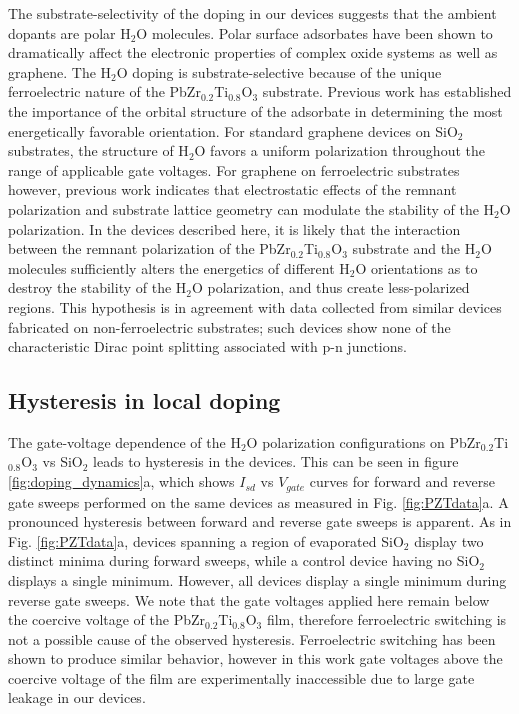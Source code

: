 \documentclass[edeposit,fullpage,draftthesis]{uiucthesis2009}
\begin{document}
        The substrate-selectivity of the doping in our devices suggests that the ambient dopants are polar H$_2$O molecules. Polar surface adsorbates have been shown to dramatically affect the electronic properties of complex oxide systems\cite{Xie2011} as well as graphene\cite{Schedin2007, Lohmann2009,Lu2014}. The H$_2$O doping is substrate-selective because of the unique ferroelectric nature of the PbZr$_{0.2}$Ti$_{0.8}$O$_3$ substrate. Previous work\cite{Leenaerts2007,Leenaerts2009} has established the importance of the orbital structure of the adsorbate in determining the most energetically favorable orientation. For standard graphene devices on SiO$_2$ substrates, the structure of H$_2$O favors a uniform polarization throughout the range of applicable gate voltages. For graphene on ferroelectric substrates however, previous work\cite{Lu2014} indicates that electrostatic effects of the remnant polarization and substrate lattice geometry can modulate the stability of the H$_2$O polarization. In the devices described here, it is likely that the interaction between the remnant polarization of the PbZr$_{0.2}$Ti$_{0.8}$O$_3$ substrate and the H$_2$O molecules sufficiently alters the energetics of different H$_2$O orientations as to destroy the stability of the H$_2$O polarization, and thus create less-polarized regions. This hypothesis is in agreement with data collected from similar devices fabricated on non-ferroelectric substrates; such devices show none of the characteristic Dirac point splitting associated with p-n junctions.

    \subsection{Hysteresis in local doping}
    
        The gate-voltage dependence of the H$_2$O polarization configurations on PbZr$_{0.2}$Ti$_{0.8}$O$_3$ vs SiO$_2$ leads to hysteresis in the devices. This can be seen in figure \ref{fig:doping_dynamics}a, which shows $I_{sd}$ vs $V_{gate}$ curves for forward and reverse gate sweeps performed on the same devices as measured in Fig. \ref{fig:PZTdata}a. A pronounced hysteresis between forward and reverse gate sweeps is apparent. As in Fig. \ref{fig:PZTdata}a, devices spanning a region of evaporated SiO$_2$ display two distinct minima during forward sweeps, while a control device having no SiO$_2$ displays a single minimum. However, all devices display a single minimum during reverse gate sweeps. We note that the gate voltages applied here remain below the coercive voltage of the PbZr$_{0.2}$Ti$_{0.8}$O$_3$ film, therefore ferroelectric switching is not a possible cause of the observed hysteresis. Ferroelectric switching has been shown to produce similar behavior\cite{Park2015b}, however in this work gate voltages above the coercive voltage of the film are experimentally inaccessible due to large gate leakage in our devices.
\end{document}
